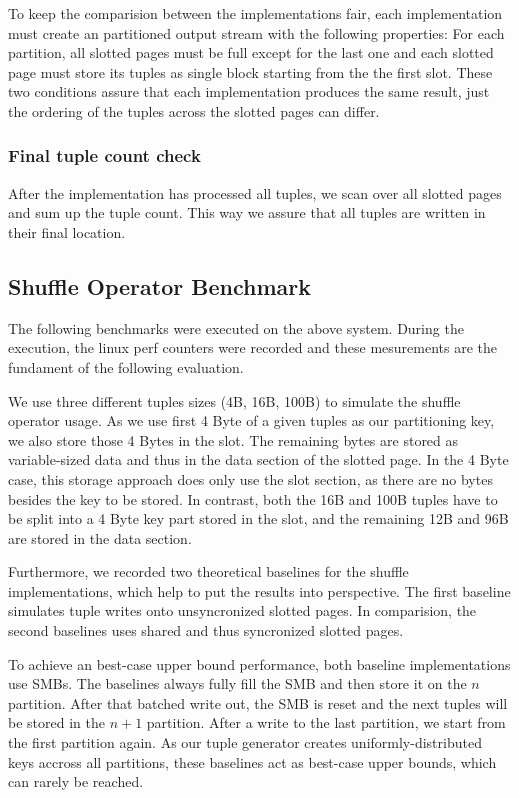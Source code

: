 To keep the comparision between the implementations fair, each implementation must create an partitioned output stream with the following properties: For each partition, all slotted pages must be full except for the last one and each slotted page must store its tuples as single block starting from the the first slot.
These two conditions assure that each implementation produces the same result, just the ordering of the tuples across the slotted pages can differ.
\subsubsection{Final tuple count check}
After the implementation has processed all tuples, we scan over all slotted pages and sum up the tuple count.
This way we assure that all tuples are written in their final location.

\subsection{Shuffle Operator Benchmark}
The following benchmarks were executed on the above system.
During the execution, the linux perf counters were recorded and these mesurements are the fundament of the following evaluation.

We use three different tuples sizes (4B, 16B, 100B) to simulate the shuffle operator usage.
As we use first 4 Byte of a given tuples as our partitioning key, we also store those 4 Bytes in the slot.
The remaining bytes are stored as variable-sized data and thus in the data section of the slotted page.
In the 4 Byte case, this storage approach does only use the slot section, as there are no bytes besides the key to be stored.
In contrast, both the 16B and 100B tuples have to be split into a 4 Byte key part stored in the slot, and the remaining 12B and 96B are stored in the data section.

Furthermore, we recorded two theoretical baselines for the shuffle implementations, which help to put the results into perspective.
The first baseline simulates tuple writes onto unsyncronized slotted pages.
In comparision, the second baselines uses shared and thus syncronized slotted pages.

To achieve an best-case upper bound performance, both baseline implementations use \acfp{SMB}.
The baselines always fully fill the \ac{SMB} and then store it on the $n$ partition.
After that batched write out, the \ac{SMB} is reset and the next tuples will be stored in the $n+1$ partition.
After a write to the last partition, we start from the first partition again.
As our tuple generator creates uniformly-distributed keys accross all partitions, these baselines act as best-case upper bounds, which can rarely be reached.

